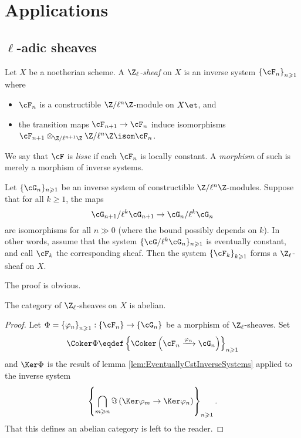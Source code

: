 \section{Applications}


\subsection{$\ell$-adic sheaves}

\begin{defi}
Let $X$ be a noetherian scheme. A \emph{$\Z_\ell$-sheaf} on $X$ is an inverse system $\left\{\cF_n\right\}_{n\geqslant 1}$ where
\begin{itemize}
\item 
$\cF_n$ is a constructible $\Z/\ell^n\Z$-module on $X\et$, and
\item 
the transition maps $\cF_{n+1}\to \cF_n$ induce isomorphisms $\cF_{n+1}\otimes_{\Z/\ell^{n+1}\Z} \Z/\ell^n\Z \isom \cF_n$.
\end{itemize}
We say that $\cF$ is \emph{lisse} if each $\cF_n$ is locally constant. A \emph{morphism} of such is merely a morphism of inverse systems.
\end{defi}

\begin{lem} \label{lem:EventuallyCstInverseSystems}
Let $\{\cG_n\}_{n\geqslant 1}$ be an inverse system of constructible $\Z/\ell^n\Z$-modules. Suppose that for all $k\geqslant 1$, the maps
$$
\cG_{n+1}/\ell^k \cG_{n+1}\to \cG_n /\ell^k \cG_n
$$
are isomorphisms for all $n\gg 0$ (where the bound possibly depends on $k$). In other words, assume that the system $\{\cG/\ell^k\cG_n\}_{n\geqslant 1}$ is eventually constant, and call $\cF_k$ the corresponding sheaf. Then the system $\left\{\cF_k\right\}_{k\geqslant 1}$ forms a $\Z_\ell$-sheaf on $X$.
\end{lem}

The proof is obvious.

\begin{lem} 
The category of $\Z_\ell$-sheaves on $X$ is abelian.
\end{lem}

\begin{proof} 
Let  $\Phi=\left\{\varphi_n\right\}_{n\geqslant 1}: \left\{\cF_n\right\}\to \left\{\cG_n\right\}$ be a morphism of $\Z_\ell$-sheaves. Set
$$
\Coker \Phi \eqdef \left\{ \Coker\left(\cF_n\xrightarrow{\varphi_n} \cG_n\right)\right\}_{n\geqslant 1}
$$
and $\Ker\Phi$ is the result of lemma \ref{lem:EventuallyCstInverseSystems} applied to the inverse system
$$
\left\{\bigcap_{m\geqslant n} \Im \left( \Ker \varphi_m \to \Ker \varphi_n \right)\right\}_{n\geqslant 1}.
$$
That this defines an abelian category is left to the reader.
\end{proof}

